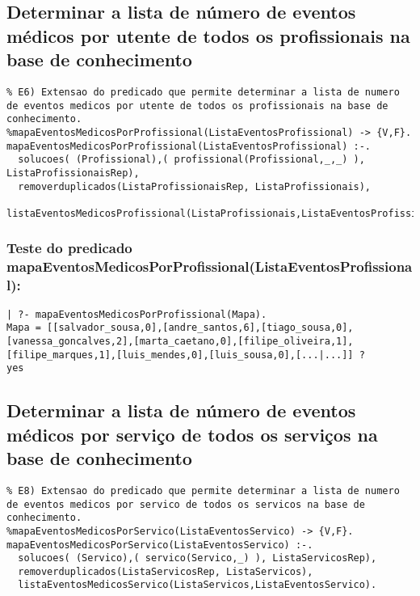 \documentclass[
  oneside,
  10pt, a4paper,
  footinclude=true,
  headinclude=true,
  cleardoublepage=empty
]{scrbook}
\begin{document}
\subsection{Determinar a lista de número de eventos médicos por utente de todos os profissionais na base de conhecimento}

\begin{lstlisting}
% E6) Extensao do predicado que permite determinar a lista de numero de eventos medicos por utente de todos os profissionais na base de conhecimento.
%mapaEventosMedicosPorProfissional(ListaEventosProfissional) -> {V,F}.
mapaEventosMedicosPorProfissional(ListaEventosProfissional) :-.
  solucoes( (Profissional),( profissional(Profissional,_,_) ), ListaProfissionaisRep),
  removerduplicados(ListaProfissionaisRep, ListaProfissionais),
  listaEventosMedicosProfissional(ListaProfissionais,ListaEventosProfissional).
\end{lstlisting}

\subsubsection{Teste do predicado \textbf{mapaEventosMedicosPorProfissional(ListaEventosProfissional)}:}

\begin{lstlisting}
| ?- mapaEventosMedicosPorProfissional(Mapa).
Mapa = [[salvador_sousa,0],[andre_santos,6],[tiago_sousa,0],[vanessa_goncalves,2],[marta_caetano,0],[filipe_oliveira,1],[filipe_marques,1],[luis_mendes,0],[luis_sousa,0],[...|...]] ? 
yes
\end{lstlisting}





\subsection{Determinar a lista de número de eventos médicos por serviço de todos os serviços na base de conhecimento}

\begin{lstlisting}
% E8) Extensao do predicado que permite determinar a lista de numero de eventos medicos por servico de todos os servicos na base de conhecimento.
%mapaEventosMedicosPorServico(ListaEventosServico) -> {V,F}.
mapaEventosMedicosPorServico(ListaEventosServico) :-.
  solucoes( (Servico),( servico(Servico,_) ), ListaServicosRep),
  removerduplicados(ListaServicosRep, ListaServicos),
  listaEventosMedicosServico(ListaServicos,ListaEventosServico).
  \end{lstlisting}
\end{document}
